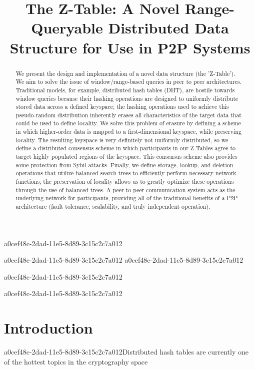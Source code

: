 \documentclass[12pt]{article}
\title{The Z-Table: A Novel Range-Queryable Distributed Data Structure for Use in P2P Systems}
\begin{document}
a0cef48c-2dad-11e5-8d89-3c15c2c7a012
\maketitle
a0cef48c-2dad-11e5-8d89-3c15c2c7a012
a0cef48c-2dad-11e5-8d89-3c15c2c7a012\begin{abstract}
We present the design and implementation of a novel data structure (the 'Z-Table'). We aim to solve the issue of window/range-based queries in peer to peer architectures. Traditional models, for example,  distributed hash tables (DHT), are hostile towards window queries because their hashing operations are designed to uniformly distribute stored data across a defined keyspace; the hashing operations used to achieve this pseudo-random distribution inherently erases all characteristics of the target data that could be used to define locality. We solve this problem of erasure by defining a scheme in which higher-order data is mapped to a first-dimensional keyspace, while preserving locality. The resulting keyspace is very definitely not uniformly distributed, so we define a distributed consensus scheme in which participants in our Z-Tables agree to target highly populated regions of the keyspace. This consensus scheme also provides some protection from Sybil attacks. Finally, we define storage, lookup, and deletion operations that utilize balanced search trees to efficiently perform necessary network functions; the preservation of locality allows us to greatly optimize these operations through the use of balanced trees. A peer to peer communication system acts as the underlying network for participants, providing all of the traditional benefits of a P2P architecture (fault tolerance, scalability, and truly independent operation).
\end{abstract}
a0cef48c-2dad-11e5-8d89-3c15c2c7a012

\newpage
a0cef48c-2dad-11e5-8d89-3c15c2c7a012\section{Introduction}
a0cef48c-2dad-11e5-8d89-3c15c2c7a012Distributed hash tables are currently one of the hottest topics in the cryptography space~\cite{Stoica:2001dj,Rowstron:2001ea,Ratnasamy:2001wn}

\printbibliography
\end{document}
